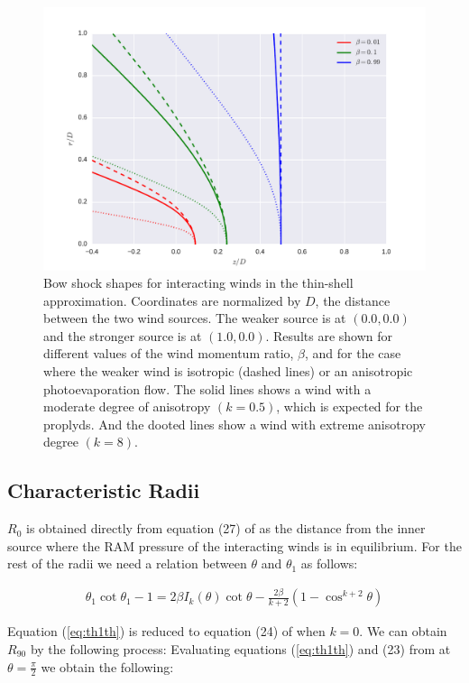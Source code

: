 \begin{figure}
\includegraphics[width=\linewidth]{r-beta}
\caption{Bow shock shapes for interacting winds in the thin-shell
  approximation. Coordinates are normalized by $D$, the distance
  between the two wind sources.  The weaker source is at \((0.0, 0.0)\)
  and the stronger source is at \((1.0, 0.0)\).  Results are shown for
  different values of the wind momentum ratio, \(\beta\), and for the
  case where the weaker wind is isotropic (dashed lines) or an
  anisotropic photoevaporation flow. The solid lines shows a wind with a
  moderate degree of anisotropy $(k=0.5)$, which is expected for the proplyds.
  And the dooted lines show a wind with extreme anisotropy degree $(k=8)$.}
\label{fig:r-beta}
\end{figure}


\subsection{Characteristic Radii}
$R_0$ is obtained directly from equation (27) of \CRW{} as the distance from the inner source where the RAM pressure of the interacting winds is in equilibrium.
For the rest of the radii we need a relation between $\theta$ and $\theta_1$ as follows:


\begin{align}
\theta_1\cot\theta_1 -1 = 2\beta I_k(\theta) \cot\theta - \frac{2\beta}{k+2}\left(1-\cos^{k+2}\theta\right)
\label{eq:th1th}
\end{align}

Equation (\ref{eq:th1th}) is reduced to equation (24) of \CRW{} when $k=0$.
We can obtain $R_{90}$ by the following process:
Evaluating equations  (\ref{eq:th1th}) and (23) from \CRW{} at $\theta=\frac{\pi}{2}$ we obtain the following:

